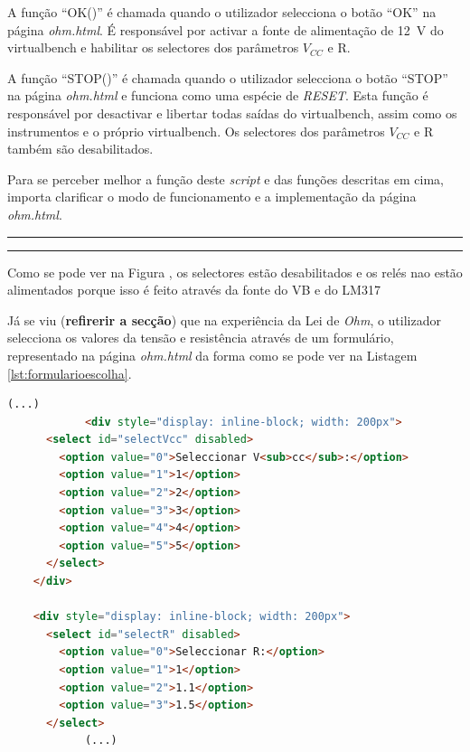 A função ``OK()'' é chamada quando o utilizador selecciona o botão ``OK'' na página \textit{ohm.html}. É responsável por activar a fonte de alimentação de \SI{12}{\volt} do \acrshort{virtualbench} e habilitar os selectores dos parâmetros $V_{CC}$ e R.

A função ``STOP()'' é chamada quando o utilizador selecciona o botão ``STOP'' na página \textit{ohm.html} e funciona como uma espécie de \textit{RESET}. Esta função é responsável por desactivar e libertar todas saídas do \acrshort{virtualbench}, assim como os instrumentos e o próprio \acrshort{virtualbench}. Os selectores dos parâmetros $V_{CC}$ e R também são desabilitados.


Para se perceber melhor a função deste \textit{script} e das funções descritas em cima, importa clarificar o modo de funcionamento e a implementação da página \textit{ohm.html}.

\hrule
\hrule

Como se pode ver na Figura , os selectores estão desabilitados e os relés nao estão alimentados porque isso é feito através da fonte do VB e do LM317

Já se viu (\textbf{refirerir a secção}) que na experiência da Lei de \textit{Ohm}, o utilizador selecciona os valores da tensão e resistência através de um formulário, representado na página \textit{ohm.html} da forma como se pode ver na Listagem \ref{lst:formularioescolha}.

\begin{center}
	\begin{minipage}{0.7\linewidth}
		\begin{lstlisting}[language=html, caption=Formulário de escolha na página \textit{ohm.html},label=lst:formularioescolha]
			(...)
			<div style="display: inline-block; width: 200px">
      <select id="selectVcc" disabled>
        <option value="0">Seleccionar V<sub>cc</sub>:</option>
        <option value="1">1</option>
        <option value="2">2</option>
        <option value="3">3</option>
        <option value="4">4</option>
        <option value="5">5</option>
      </select>
    </div>

    <div style="display: inline-block; width: 200px">
      <select id="selectR" disabled>
        <option value="0">Seleccionar R:</option>
        <option value="1">1</option>
        <option value="2">1.1</option>
        <option value="3">1.5</option>
      </select>
			(...)
	\end{lstlisting}
	\end{minipage}
\end{center}


